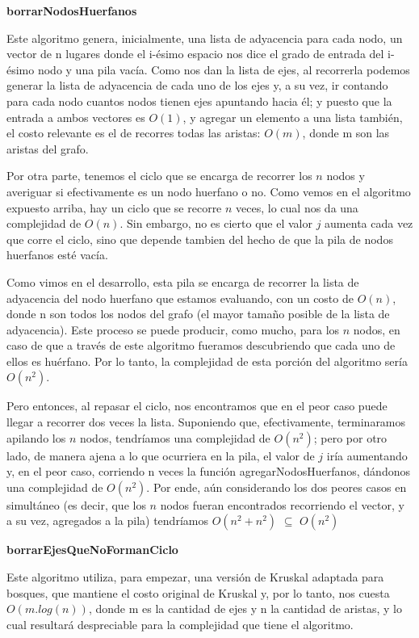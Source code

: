 \begin{center}
	\textbf{borrarNodosHuerfanos}
\end{center}

Este algoritmo genera, inicialmente, una lista de adyacencia para cada nodo, un vector de n lugares donde el i-ésimo espacio nos dice el grado de entrada del i-ésimo nodo y una pila vacía. Como nos dan la lista de ejes, al recorrerla podemos generar la lista de adyacencia de cada uno de los ejes y, a su vez, ir contando para cada nodo cuantos nodos tienen ejes apuntando hacia él; y puesto que la entrada a ambos vectores es $O(1)$, y agregar un elemento a una lista también, el costo relevante es el de recorres todas las aristas: $O(m)$, donde m son las aristas del grafo.

Por otra parte, tenemos el ciclo que se encarga de recorrer los $n$ nodos y averiguar si efectivamente es un nodo huerfano o no. Como vemos en el algoritmo expuesto arriba, hay un ciclo que se recorre $n$ veces, lo cual nos da una complejidad de $O(n)$. Sin embargo, no es cierto que el valor $j$ aumenta cada vez que corre el ciclo, sino que depende tambien del hecho de que la pila de nodos huerfanos esté vacía.

Como vimos en el desarrollo, esta pila se encarga de recorrer la lista de adyacencia del nodo huerfano que estamos evaluando, con un costo de $O(n)$, donde n son todos los nodos del grafo (el mayor tamaño posible de la lista de adyacencia). Este proceso se puede producir, como mucho, para los $n$ nodos, en caso de que a través de este algoritmo fueramos descubriendo que cada uno de ellos es huérfano. Por lo tanto, la complejidad de esta porción del algoritmo sería $O(n^2)$.

Pero entonces, al repasar el ciclo, nos encontramos que en el peor caso puede llegar a recorrer dos veces la lista. Suponiendo que, efectivamente, terminaramos apilando los $n$ nodos, tendríamos una complejidad de $O(n^2)$; pero por otro lado, de manera ajena a lo que ocurriera en la pila, el valor de $j$ iría aumentando y, en el peor caso, corriendo n veces la función agregarNodosHuerfanos, dándonos una complejidad de $O(n^2)$. Por ende, aún considerando los dos peores casos en simultáneo (es decir, que los $n$ nodos fueran encontrados recorriendo el vector, y a su vez, agregados a la pila) tendríamos $O(n^2 + n^2)$ $\subseteq$ $O(n^2)$

\begin{center}
\textbf{borrarEjesQueNoFormanCiclo}
\end{center}
Este algoritmo utiliza, para empezar, una versión de Kruskal adaptada para bosques, que mantiene el costo original de Kruskal y, por lo tanto, nos cuesta $O(m.log(n))$, donde m es la cantidad de ejes y n la cantidad de aristas, y lo cual resultará despreciable para la complejidad que tiene el algoritmo.

